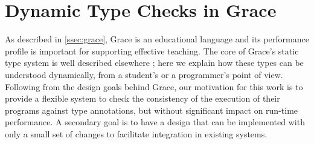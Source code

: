 
\section{Dynamic Type Checks in Grace}
\label{sec:method}




As described in \cref{ssec:grace},
Grace is an educational language and its performance profile
is important for supporting effective teaching. 
%
%
The core of Grace's static type system is well described elsewhere
\cite{JonesECOOP2016}; here we explain how these types can be understood
dynamically, from a student's or a programmer's point of view.
Following from the design goals behind Grace,
our motivation for this work
is to provide a flexible system 
to check the consistency of the execution of their programs 
against type annotations,
but without significant impact on run-time performance.
A secondary goal is to have a design that can be implemented with
only a small set of changes to facilitate integration in existing systems.
%
%


